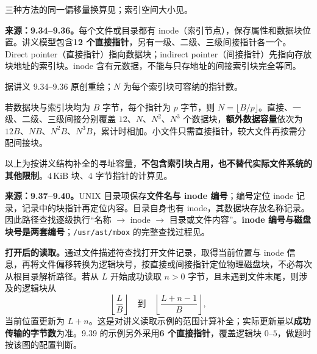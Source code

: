 三种方法的同一偏移量换算见；索引空间大小见。


\textbf{来源：9.34--9.36。}每个文件或目录都有 inode（索引节点），保存属性和数据块位置。讲义模型包含\textbf{12 个直接指针}，另有一级、二级、三级间接指针各一个。Direct pointer（直接指针）指向数据块；indirect pointer（间接指针）先指向存放块地址的索引块。inode 含有元数据，不能与只存地址的间接索引块完全等同。

\begin{center}


{\small 据讲义 9.34--9.36 原创重绘；$N$ 为每个索引块可容纳的指针数。}
\end{center}

若数据块与索引块均为 $B$ 字节，每个指针为 $p$ 字节，则 $N=\lfloor B/p\rfloor$。直接、一级、二级、三级间接分别覆盖 $12$、$N$、$N^2$、$N^3$ 个数据块，\textbf{额外数据容量}依次为 $12B$、$NB$、$N^2B$、$N^3B$，累计时相加。小文件只需直接指针，较大文件再按需分配间接块。

以上为按讲义结构补全的寻址容量，\textbf{不包含索引块占用，也不替代实际文件系统的其他限制}。$4\,\mathrm{KiB}$ 块、4 字节指针的计算见。


\textbf{来源：9.37--9.40。}UNIX 目录项保存\textbf{文件名与 inode 编号}；编号定位 inode 记录，记录中的块指针再定位内容。目录自身也有 inode，其数据块存放名称记录。因此路径查找逐级执行“名称 $\to$ inode $\to$ 目录或文件内容”。\textbf{inode 编号与磁盘块号是两套编号}；\texttt{/usr/ast/mbox} 的完整查找过程见。

\textbf{打开后的读取。}通过文件描述符查找打开文件记录，取得当前位置与 inode 信息，再将文件偏移转换为逻辑块号，按直接或间接指针定位物理磁盘块，不必每次从根目录解析路径。若从 $L$ 开始成功读取 $n>0$ 字节，且未遇到文件末尾，则涉及的逻辑块从
\[
  \left\lfloor\frac{L}{B}\right\rfloor
  \quad\text{到}\quad
  \left\lfloor\frac{L+n-1}{B}\right\rfloor,
\]
当前位置更新为 $L+n$。这是对讲义读取示例的范围计算补全；实际更新量以\textbf{成功传输的字节数}为准。9.39 的示例另外采用\textbf{6 个直接指针}，覆盖逻辑块 $0$--$5$，做题时按该图的配置判断。


